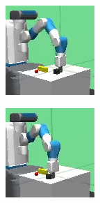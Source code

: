 \begin{figure}
\begin{subfigure}[b]{.19\textwidth}
    \end{subfigure}
    \begin{subfigure}[b]{.19\textwidth}
    \centering
    \includegraphics[width=\textwidth]{images/results/push-barrier-drq/frames/frame_2.png}
    \end{subfigure}
    \begin{subfigure}[b]{.19\textwidth}
    \centering
    \includegraphics[width=\textwidth]{images/results/push-barrier-drq/frames/frame_3.png}

\end{subfigure}
\end{figure}
